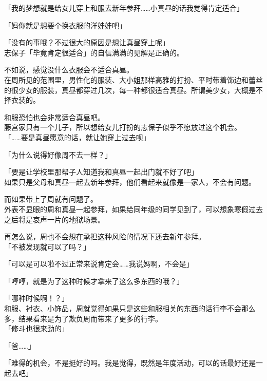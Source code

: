 「我的梦想就是给女儿穿上和服去新年参拜……小真昼的话我觉得肯定适合」

「妈你就是想要个换衣服的洋娃娃吧」

「没有的事哦？不过很大的原因是想让真昼穿上呢」\\

志保子「毕竟肯定很适合」的自信满满的见解是正确的。

不如说，感觉没什么衣服会不适合真昼。\\

在周所见的范围里，男性化的服装、大小姐那样高雅的打扮、平时带着饰边和蕾丝的很少女的服装，真昼都穿过几次，每一种都很适合真昼。所谓美少女，大概是不择衣装的。

和服恐怕也会非常适合真昼吧。\\

藤宫家只有一个儿子，所以想给女儿打扮的志保子似乎不愿放过这个机会。\\

「……要是真昼愿意的话，就让她穿上过去呗」

「为什么说得好像周不去一样？」

「要是让学校里那帮子人知道我和真昼一起出门就不好了吧」\\

如果只是父母和真昼一起去新年参拜，他们看起来就像是一家人，不会有问题。

而如果带上了周就有问题了。\\

外表不显眼的周和真昼一起参拜，如果给同年级的同学见到了，可以想象寒假过去之后将是哀声一片的地狱场景。

再怎么说，周也不会想在承担这种风险的情况下还去新年参拜。\\

「不被发现就可以了吗？」

「可以是可以啦不过正常来说肯定会……我说妈啊，不会是」

「哼哼，就是为了这种时候才拿来了这么多东西的哦？」

「哪种时候啊！？」\\

和服、衬衣、小饰品，周就觉得如果只是这些和服相关的东西的话行李不会那么多，结果看来是为了欺负周而带来了更多的行李。\\

「修斗也很来劲的」

「爸……」

「难得的机会，不是挺好的吗。我是觉得，既然是年度活动，可以的话最好还是一起去吧」\\

